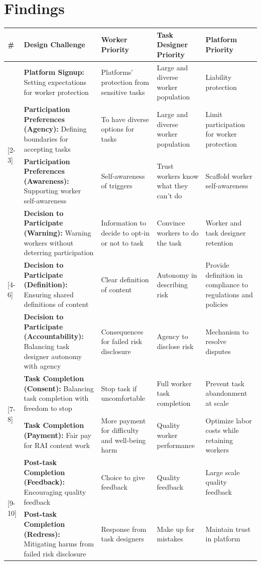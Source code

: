 \section{Findings}
\small
\begin{longtable}{|p{0.7cm}|p{5cm}|p{2.5cm}|p{3cm}|p{2.5cm}|}
\hline
\textbf{\#} & \textbf{Design Challenge} & \textbf{Worker Priority} & \textbf{Task Designer Priority} & \textbf{Platform Priority}\\
\hline
\endhead
[1] & \textbf{Platform Signup:} Setting expectations for worker protection & Platforms' protection from sensitive tasks & Large and diverse worker population & Liability protection \\
\hline
\multirow{2}{*}{[2-3]} & \textbf{Participation Preferences (Agency):} Defining boundaries for accepting tasks & To have diverse options for tasks & Large and diverse worker population & Limit participation for worker protection \\
 & \textbf{Participation Preferences (Awareness):} Supporting worker self-awareness & Self-awareness of triggers & Trust workers know what they can't do & Scaffold worker self-awareness \\
\hline
\multirow{3}{*}{[4-6]} & \textbf{Decision to Participate (Warning):} Warning workers without deterring participation & Information to decide to opt-in or not to task & Convince workers to do the task & Worker and task designer retention \\
 & \textbf{Decision to Participate (Definition):} Ensuring shared definitions of content & Clear definition of content & Autonomy in describing risk & Provide definition in compliance to regulations and policies \\
 & \textbf{Decision to Participate (Accountability):} Balancing task designer autonomy with agency & Consequences for failed risk disclosure & Agency to disclose risk & Mechanism to resolve disputes \\
\hline
\multirow{2}{*}{[7-8]} & \textbf{Task Completion (Consent):} Balancing task completion with freedom to stop & Stop task if uncomfortable & Full worker task completion & Prevent task abandonment at scale \\
 & \textbf{Task Completion (Payment):} Fair pay for RAI content work & More payment for difficulty and well-being harm & Quality worker performance & Optimize labor costs while retaining workers \\
\hline
\multirow{2}{*}{[9-10]} & \textbf{Post-task Completion (Feedback):} Encouraging quality feedback & Choice to give feedback & Quality feedback & Large scale quality feedback \\
& \textbf{Post-task Completion (Redress):} Mitigating harms from failed risk disclosure & Response from task designers & Make up for mistakes & Maintain trust in platform \\
\hline
\end{longtable}
\normalsize


